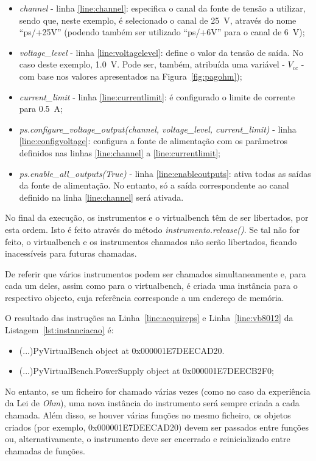 \begin{itemize}
	\item \textit{channel} - linha \ref{line:channel}: especifica o canal da fonte de tensão a utilizar, sendo que, neste exemplo, é selecionado o canal de \SI{25}{\volt}, através do nome ``ps/+25V'' (podendo também ser utilizado ``ps/+6V'' para o canal de \SI{6}{\volt});
	\item \textit{voltage\_level} - linha \ref{line:voltagelevel}: define o valor da tensão de saída. No caso deste exemplo, \SI{1.0}{\volt}. Pode ser, também, atribuída uma variável - $V_{cc}$ - com base nos valores apresentados na Figura~\ref{fig:pagohm});
	\item  \textit{current\_limit} - linha \ref{line:currentlimit}: é configurado o limite de corrente para \SI{0.5}{\ampere};
	\item \textit{ps.configure\_voltage\_output(channel, voltage\_level, current\_limit)} - linha \ref{line:configvoltage}: configura a fonte de alimentação com os parâmetros definidos nas linhas \ref{line:channel} a \ref{line:currentlimit};
	\item \textit{ps.enable\_all\_outputs(True)} - linha \ref{line:enableoutputs}: ativa todas as saídas da fonte de alimentação. No entanto, só a saída correspondente ao canal definido na linha \ref{line:channel} será ativada.
\end{itemize}

No final da execução, os instrumentos e o \acrshort{virtualbench} têm de ser libertados, por esta ordem. Isto é feito através do método \textit{instrumento.release()}. Se tal não for feito, o \acrshort{virtualbench} e os instrumentos chamados não serão libertados, ficando inacessíveis para futuras chamadas. 

De referir que vários instrumentos podem ser chamados simultaneamente e, para cada um deles, assim como para o \acrshort{virtualbench}, é criada uma instância para o respectivo objecto, cuja referência corresponde a um endereço de memória. 

O resultado das instruções na Linha~\ref{line:acquireps} e Linha~\ref{line:vb8012} da Listagem~\ref{lst:instanciacao} é:
\begin{itemize}
	\item (...)PyVirtualBench object at 0x000001E7DEECAD20.
	\item (...)PyVirtualBench.PowerSupply object at 0x000001E7DEECB2F0;
\end{itemize}

No entanto, se um ficheiro for chamado várias vezes (como no caso da experiência da Lei de \textit{Ohm}), uma nova instância do instrumento será sempre criada a cada chamada. Além disso, se houver várias funções no mesmo ficheiro, os objetos criados (por exemplo, 0x000001E7DEECAD20) devem ser passados entre funções ou, alternativamente, o instrumento deve ser encerrado e reinicializado entre chamadas de funções.

